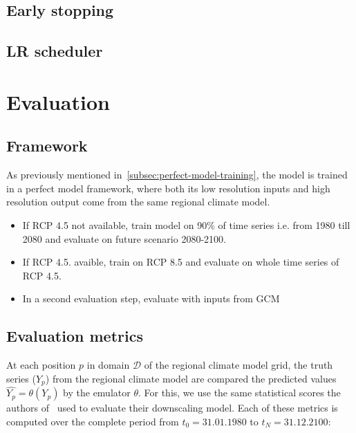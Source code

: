 \documentclass[a4paper,11pt,oneside]{report}
\begin{document}
\subsection{Early stopping}
\subsection{LR scheduler}


\section{Evaluation}\label{sec:evaluation}

\subsection{Framework}\label{subsec:evaluation-framework}
As previously mentioned in~\ref{subsec:perfect-model-training}, the model is trained in a perfect model framework, where both its low resolution inputs and high resolution output come from the same regional climate model.
\begin{itemize}
\item If RCP 4.5 not available, train model on 90\% of time series i.e. from 1980 till 2080 and evaluate on future scenario 2080-2100. 
    \item If RCP 4.5. avaible, train on RCP 8.5 and evaluate on whole time series of RCP 4.5.
    \item In a second evaluation step, evaluate with inputs from GCM 
\end{itemize}


\subsection{Evaluation metrics}\label{subsec:evaluation-metrics}
At each position $p$ in domain $\mathcal{D} $ of the regional climate model grid, the truth series ($Y_{p}$) from the regional climate model are compared the predicted values $\widehat{Y_{p}}= \theta(Y_{p})$ by the emulator $\theta$. For this, we use the same statistical scores the authors of~\cite{Doury} used to evaluate their downscaling model. Each of these metrics is computed over the complete period from $t_{0}=31.01.1980$ to $t_{N}=31.12.2100$:
\end{document}
